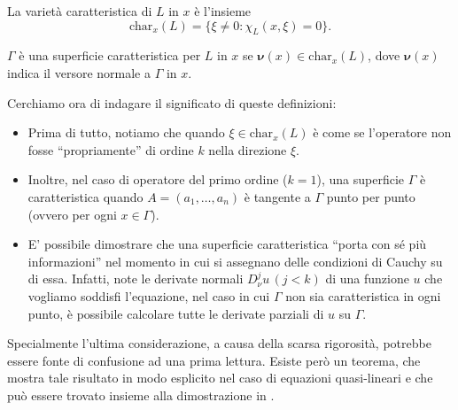 \begin{definition}
La varietà caratteristica di $L$ in $x$ è l'insieme $$\text{char}_x (L)= \{ \xi \neq 0 : \chi_L(x,\xi)=0 \}.$$
\end{definition}

\begin{definition} \label{supcarlin}
$\Gamma$ è una superficie caratteristica per $L$ in $x$ se $\boldsymbol{\nu}(x) \in\text{char}_x (L)$, dove $\boldsymbol{\nu}(x)$ indica il versore normale a $\Gamma$ in $x$.
\end{definition}

Cerchiamo ora di indagare il significato di queste definizioni:
\begin{itemize}
\item Prima di tutto, notiamo che quando $\xi \in \text{char}_x (L)$ è come se l'operatore non fosse ``propriamente'' di ordine $k$ nella direzione $\xi$.
\item Inoltre, nel caso di operatore del primo ordine ($k=1$), una superficie $\Gamma$ è caratteristica quando $A=(a_1,\ldots ,a_n)$ è tangente a $\Gamma$ punto per punto (ovvero per ogni $x\in \Gamma$).
\item E' possibile dimostrare che una superficie caratteristica ``porta con sé più informazioni'' nel momento in cui si assegnano delle condizioni di Cauchy su di essa. Infatti, note le derivate normali $D^j_\nu u \,(j<k)$ di una funzione $u$ che vogliamo soddisfi l'equazione, nel caso in cui $\Gamma$ non sia caratteristica in ogni punto, è possibile calcolare tutte le derivate parziali di $u$ su $\Gamma$.
\end{itemize}
\newpage
Specialmente l'ultima considerazione, a causa della scarsa rigorosità, potrebbe essere fonte di confusione ad una prima lettura. Esiste però un teorema, che mostra tale risultato in modo esplicito nel caso di equazioni quasi-lineari e che può essere trovato insieme alla dimostrazione in \cite[cap.4.6]{Evans}.

